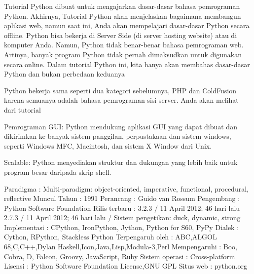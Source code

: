 \vspace{14pt}
\noindent 
{\fontsize{14pt}{14pt}\selectfont Tutorial Python dibuat untuk mengajarkan dasar-dasar bahasa pemrograman Python. Akhirnya, Tutorial Python akan menjelaskan bagaimana membangun aplikasi web, namun saat ini, Anda akan mempelajari dasar-dasar Python secara offline. Python bisa bekerja di Server Side (di server hosting website) atau di komputer Anda. Namun, Python tidak benar-benar bahasa pemrograman web. Artinya, banyak program Python tidak pernah dimaksudkan untuk digunakan secara online. Dalam tutorial Python ini, kita hanya akan membahas dasar-dasar Python dan bukan perbedaan keduanya \\} \par
\vspace{14pt}
\noindent 
{\fontsize{14pt}{14pt}\selectfont Python bekerja sama seperti dua kategori sebelumnya, PHP dan ColdFusion karena semuanya adalah bahasa pemrograman sisi server. Anda akan melihat dari tutorial \\} \par
\noindent 
{\fontsize{14pt}{14pt}\selectfont Pemrograman GUI: Python mendukung aplikasi GUI yang dapat dibuat dan dikirimkan ke banyak sistem panggilan, perpustakaan dan sistem windows, seperti Windows MFC, Macintosh, dan sistem X Window dari Unix. \\} \par
\noindent 
{\fontsize{14pt}{14pt}\selectfont Scalable: Python menyediakan struktur dan dukungan yang lebih baik untuk program besar daripada skrip shell. \\} \par
\vspace{14pt}
\noindent 
{\fontsize{14pt}{14pt}\selectfont Paradigma : Multi-paradigm: object-oriented, imperative, functional, procedural, reflective\vspace{\baselineskip}
Muncul Tahun : 1991\vspace{\baselineskip}
Perancang : Guido van Rossum\vspace{\baselineskip}
Pengembang : Python Software Foundation\vspace{\baselineskip}
Rilis terbaru : 3.2.3 / 11 April 2012; 46 hari lalu 2.7.3 / 11 April 2012; 46 hari lalu /\vspace{\baselineskip}
Sistem pengetikan: duck, dynamic, strong\vspace{\baselineskip}
Implementasi : CPython, IronPython, Jython, Python for S60, PyPy\vspace{\baselineskip}
Dialek : Cython, RPython, Stackless Python\vspace{\baselineskip}
Terpengaruh oleh : ABC,ALGOL 68,C,C++,Dylan Haskell,Icon,Java,Lisp,Modula-3,Perl\vspace{\baselineskip}
Mempengaruhi : Boo, Cobra, D, Falcon, Groovy, JavaScript, Ruby\vspace{\baselineskip}
Sistem operasi : Cross-platform\vspace{\baselineskip}
Lisensi : Python Software Foundation License,GNU GPL\vspace{\baselineskip}
Situs web : python.org \\} \par
